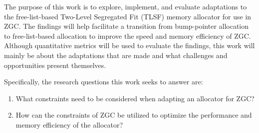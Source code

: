 
The purpose of this work is to explore, implement, and evaluate adaptations to the free-list-based Two-Level Segregated Fit (TLSF) memory allocator for use in ZGC. The findings will help facilitate a transition from bump-pointer allocation to free-list-based allocation to improve the speed and memory efficiency of ZGC. Although quantitative metrics will be used to evaluate the findings, this work will mainly be about the adaptations that are made and what challenges and opportunities present themselves.

Specifically, the research questions this work seeks to answer are:

\begin{enumerate}
    \item What constraints need to be considered when adapting an allocator for ZGC?
    \item How can the constraints of ZGC be utilized to optimize the performance and memory efficiency of the allocator?
\end{enumerate}

